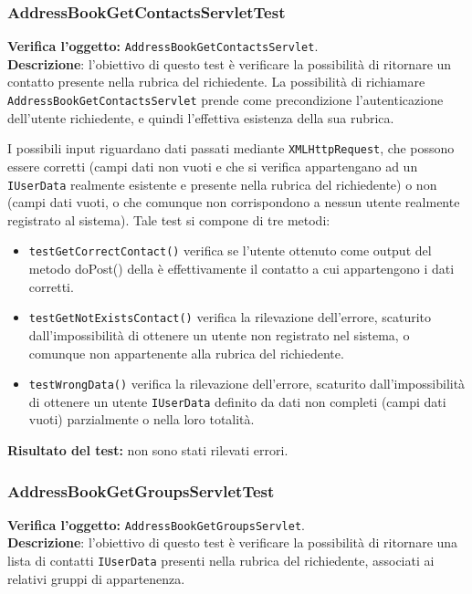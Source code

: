 \subsubsection{AddressBookGetContactsServletTest}
\textbf{Verifica l'oggetto:} \texttt{AddressBookGetContactsServlet}.\\
\textbf{Descrizione}: l'obiettivo di questo test è verificare la possibilità di ritornare un contatto presente nella rubrica del richiedente. La possibilità di richiamare \texttt{AddressBookGetContactsServlet} prende come precondizione l'autenticazione dell'utente richiedente, e quindi l'effettiva esistenza della sua rubrica.

I possibili input riguardano dati passati mediante \texttt{XMLHttpRequest}, che possono essere corretti (campi dati non vuoti e che si verifica appartengano ad un \texttt{IUserData} realmente esistente e presente nella rubrica del richiedente) o non (campi dati vuoti, o che comunque non corrispondono a nessun utente realmente registrato al sistema).
Tale test si compone di tre metodi:
\begin{itemize}
\item \texttt{testGetCorrectContact()} verifica se l'utente ottenuto come output del metodo doPost() della  è effettivamente il contatto a cui appartengono i dati corretti.
\item \texttt{testGetNotExistsContact()} verifica la rilevazione dell'errore, scaturito dall'impossibilità di ottenere un utente non registrato nel sistema, o comunque non appartenente alla rubrica del richiedente.
\item \texttt{testWrongData()} verifica la rilevazione dell'errore, scaturito dall'impossibilità di ottenere un utente \texttt{IUserData} definito da dati non completi (campi dati vuoti) parzialmente o nella loro totalità.
\end{itemize}
\textbf{Risultato del test:} non sono stati rilevati errori.

\subsubsection{AddressBookGetGroupsServletTest}
\textbf{Verifica l'oggetto:} \texttt{AddressBookGetGroupsServlet}.\\
\textbf{Descrizione}: l'obiettivo di questo test è verificare la possibilità di ritornare una lista di contatti \texttt{IUserData} presenti nella rubrica del richiedente, associati ai relativi gruppi di appartenenza.

